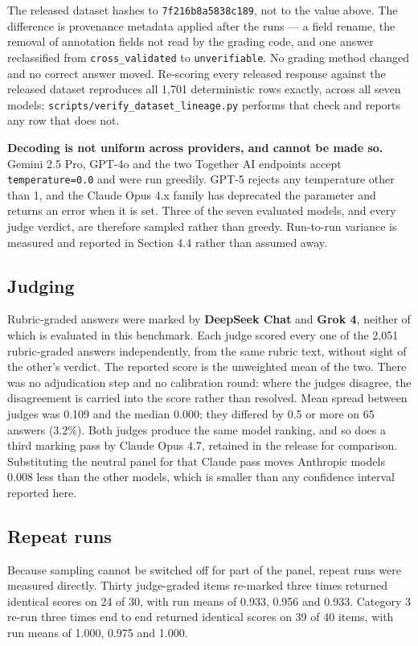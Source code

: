 \documentclass[11pt,a4paper]{article}
\begin{document}
The released dataset hashes to \texttt{7f216b8a5838c189}, not to the value above. The difference is provenance metadata applied after the runs --- a field rename, the removal of annotation fields not read by the grading code, and one answer reclassified from \texttt{cross\_validated} to \texttt{unverifiable}. No grading method changed and no correct answer moved. Re-scoring every released response against the released dataset reproduces all 1,701 deterministic rows exactly, across all seven models; \texttt{scripts/verify\_dataset\_lineage.py} performs that check and reports any row that does not.

\textbf{Decoding is not uniform across providers, and cannot be made so.} Gemini 2.5 Pro, GPT-4o and the two Together AI endpoints accept \texttt{temperature=0.0} and were run greedily. GPT-5 rejects any temperature other than 1, and the Claude Opus 4.x family has deprecated the parameter and returns an error when it is set. Three of the seven evaluated models, and every judge verdict, are therefore sampled rather than greedy. Run-to-run variance is measured and reported in Section 4.4 rather than assumed away.

\subsection{Judging}

Rubric-graded answers were marked by \textbf{DeepSeek Chat} and \textbf{Grok 4}, neither of which is evaluated in this benchmark. Each judge scored every one of the 2,051 rubric-graded answers independently, from the same rubric text, without sight of the other's verdict. The reported score is the unweighted mean of the two. There was no adjudication step and no calibration round: where the judges disagree, the disagreement is carried into the score rather than resolved. Mean spread between judges was 0.109 and the median 0.000; they differed by 0.5 or more on 65 answers (3.2\%). Both judges produce the same model ranking, and so does a third marking pass by Claude Opus 4.7, retained in the release for comparison. Substituting the neutral panel for that Claude pass moves Anthropic models 0.008 less than the other models, which is smaller than any confidence interval reported here.

\subsection{Repeat runs}

Because sampling cannot be switched off for part of the panel, repeat runs were measured directly. Thirty judge-graded items re-marked three times returned identical scores on 24 of 30, with run means of 0.933, 0.956 and 0.933. Category 3 re-run three times end to end returned identical scores on 39 of 40 items, with run means of 1.000, 0.975 and 1.000.
\end{document}
